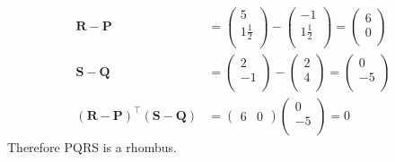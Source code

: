 \documentclass[12pt]{article}
\providecommand{\brak}[1]{\ensuremath{\left(#1\right)}}
\newcommand{\myvec}[1]{\ensuremath{\begin{pmatrix}#1\end{pmatrix}}}
\let\vec\mathbf
\begin{document}
\begin{enumerate}
\begin{align}
\vec{R}-\vec{P} &=  \myvec{
 5 \\
 1\frac{1}{2} \\
 } - \myvec{
 -1 \\
 1\frac{1}{2} \\
 } = \myvec{
 6 \\
 0 \\ 
 } \\
 \vec{S}-\vec{Q} &=  \myvec{
 2 \\
 -1 \\
 } - \myvec{
 2 \\
 4 \\
 } = \myvec{
 0 \\
 -5 \\ 
 } \\ 
 \brak{\vec{R}-\vec{P}}^\top\brak{\vec{S}-\vec{Q}} &= \myvec{
 6 & 0} \myvec{
 0 \\
 -5 \\
 } = 0
\end{align}
Therefore PQRS is a rhombus.

\end{enumerate}
\end{document}
